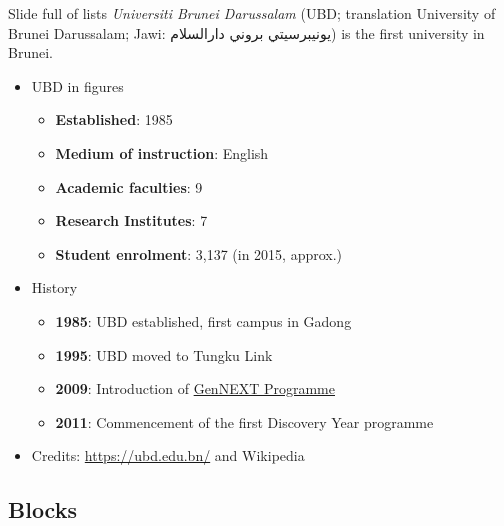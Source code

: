 \documentclass[,aspectratio=43]{beamer}
\providecommand{\tightlist}{%
  \setlength{\itemsep}{0pt}\setlength{\parskip}{0pt}}
\begin{document}
\begin{frame}{Slide full of lists}
\label{slide-full-of-lists}
\emph{Universiti Brunei Darussalam} (UBD; translation University of
Brunei Darussalam; Jawi: \textarabic{يونيبرسيتي بروني دارالسلام}) is the
first university in Brunei.

\begin{itemize}
\tightlist
\item
  UBD in figures

  \begin{itemize}
  \tightlist
  \item
    \textbf{Established}: 1985
  \item
    \textbf{Medium of instruction}: English
  \item
    \textbf{Academic faculties}: 9
  \item
    \textbf{Research Institutes}: 7
  \item
    \textbf{Student enrolment}: 3,137 (in 2015, approx.)
  \end{itemize}
\item
  History

  \begin{itemize}
  \tightlist
  \item
    \textbf{1985}: UBD established, first campus in Gadong
  \item
    \textbf{1995}: UBD moved to Tungku Link
  \item
    \textbf{2009}: Introduction of
    \href{https://ubd.edu.bn/admission/undergraduate/gennext-degree-programme/}{GenNEXT
    Programme}
  \item
    \textbf{2011}: Commencement of the first Discovery Year programme
  \end{itemize}
\item
  Credits: \url{https://ubd.edu.bn/} and Wikipedia
\end{itemize}
\end{frame}

\subsection{Blocks}\label{blocks}
\end{document}
